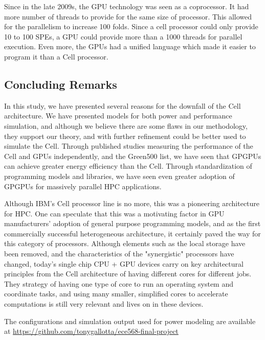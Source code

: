 \documentclass{sig-alternate-05-2015}
\begin{document}
Since in the late 2009s, the GPU technology was seen as a coprocessor. It had more number of threads to provide for the same size of processor. This allowed for the parallelism to increase 100 folds. Since a cell processor could only provide 10 to 100 SPEs, a GPU could provide more than a 1000 threads for parallel execution. Even more, the GPUs had a unified language which made it easier to program it than a Cell processor.

\subsection{Concluding Remarks}

In this study, we have presented several reasons for the downfall of the Cell architecture. We have presented models for both power and performance simulation, and although we believe there are some flaws in our methodology, they support our theory, and with further refinement could be better used to simulate the Cell. Through published studies measuring the performance of the Cell and GPUs independently, and the Green500 list, we have seen that GPGPUs can achieve greater energy efficiency than the Cell. Through standardization of programming models and libraries, we have seen even greater adoption of GPGPUs for massively parallel HPC applications.

Although IBM's Cell processor line is no more, this was a pioneering architecture for HPC. One can speculate that this was a motivating factor in GPU manufacturers' adoption of general purpose programming models, and as the first commercially successful heterogeneous architecture, it certainly paved the way for this category of processors. Although elements such as the local storage have been removed, and the characteristics of the "synergistic" processors have changed, today's single chip CPU + GPU devices carry on key architectural principles from the Cell architecture of having different cores for different jobs. They strategy of having one type of core to run an operating system and coordinate tasks, and using many smaller, simplified cores to accelerate computations is still very relevant and lives on in these devices.



%
%

\appendix

The configurations and simulation output used for power modeling are available at \url{https://github.com/tonygallotta/ece568-final-project}
\end{document}
